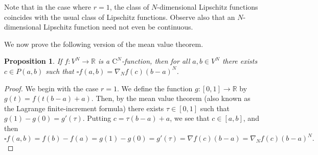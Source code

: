\documentclass{amsart}
\theoremstyle{plain}%
\newtheorem{proposition}[theorem]{Proposition}
\theoremstyle{definition}
\theoremstyle{remark}
\begin{document}
Note that in the case where $r=1$, the class of $N$\nobreakdash-dimensional Lipschitz functions coincides with the usual class of Lipschitz functions. Observe also that an $N$\nobreakdash-dimensional Lipschitz function need not even be continuous.

We now prove the following version of the mean value theorem.

\begin{proposition}\label{prop:finIncrementNdim}
If $f\colon V^N\to \mathbb{R}$ is a $\mathrm{C}^N$\nobreakdash-function, then for all $a,b\in V^N$ there exists $c\in P(a,b)$ such that $\square f(a,b)=\nabla\!_Nf(c)(b-a)^N$.
\end{proposition} 

\begin{proof} 
We begin with the case $r=1$. We define the function $g\colon[0,1]\to\mathbb{R}$ by $g(t)=f\left(t(b-a)+a\right)$. 
Then, by the mean value theorem (also known as the Lagrange finite-increment formula) there exists $\tau\in[0,1]$ such that $g(1)-g(0)=g'(\tau)$. 
Putting $c=\tau(b-a)+a$, we see that $c\in [a,b]$, and then
\begin{equation*}
\square f(a,b)=f(b)-f(a)=g(1)-g(0)=g'(\tau)=\nabla f(c)(b-a)=\nabla_N f(c)(b-a)^N.
\end{equation*} 


\end{proof}
\end{document}
